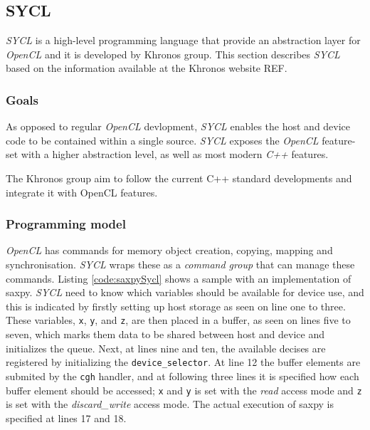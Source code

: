 
\subsection{SYCL}
\textit{SYCL} is a high-level programming language that provide an abstraction layer for \textit{OpenCL} and it is developed by Khronos group. This section describes \textit{SYCL} based on the information available at the Khronos website REF.

\subsubsection{Goals}
As opposed to regular \textit{OpenCL} devlopment, \textit{SYCL} enables the host and device code to be contained within a single source. \textit{SYCL} exposes the \textit{OpenCL} feature-set with a higher abstraction level, as well as most modern \textit{C++} features. 

The Khronos group aim to follow the current C++ standard developments and integrate it with OpenCL features.

\subsubsection{Programming model}
\textit{OpenCL} has commands for memory object creation, copying, mapping and synchronisation. \textit{SYCL} wraps these as a \textit{command group} that can manage these commands. Listing \ref{code:saxpySycl} shows a sample with an implementation of saxpy. \textit{SYCL} need to know which variables should be available for device use, and this is indicated by firstly setting up host storage as seen on line one to three. These variables, \texttt{x}, \texttt{y}, and \texttt{z}, are then placed in a buffer, as seen on lines five to seven, which marks them data to be shared between host and device and initializes the queue. Next, at lines nine and ten, the available decises are registered by initializing the \texttt{device\_selector}. At line 12 the buffer elements are submited by the \texttt{cgh} handler, and at following three lines it is specified how each buffer element should be accessed; \texttt{x} and \texttt{y} is set with the \textit{read} access mode and \texttt{z} is set with the \textit{discard\_write} access mode. The actual execution of saxpy is specified at lines 17 and 18.

